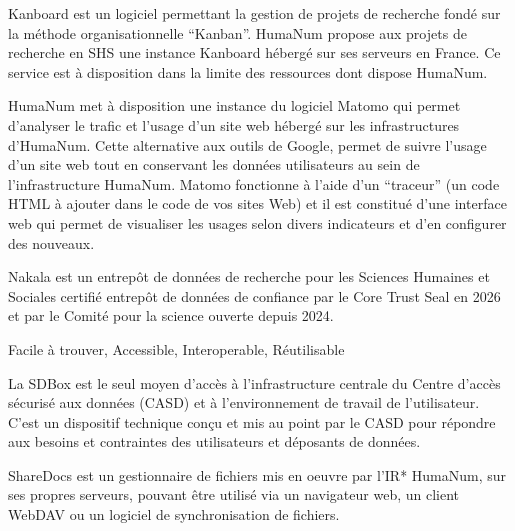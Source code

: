 \documentclass[letterpaper,10pt,english]{jupyterBook}
\begin{document}
\begin{description}
\sphinxAtStartPar
Kanboard est un logiciel permettant la gestion de projets de recherche fondé sur la méthode organisationnelle “Kanban”. Huma\sphinxhyphen{}Num propose aux projets de recherche en SHS une instance Kanboard hébergé sur ses serveurs en France. Ce service est à disposition dans la limite des ressources dont dispose Huma\sphinxhyphen{}Num.

\sphinxAtStartPar
Huma\sphinxhyphen{}Num met à disposition une instance du logiciel Matomo qui permet d’analyser le trafic et l’usage d’un site web hébergé sur les infrastructures d’Huma\sphinxhyphen{}Num. Cette alternative aux outils de Google, permet de suivre l’usage d’un site web tout en conservant les données utilisateurs au sein de l’infrastructure Huma\sphinxhyphen{}Num. Matomo fonctionne à l’aide d’un “traceur” (un code HTML à ajouter dans le code de vos sites Web) et il est constitué d’une interface web qui permet de visualiser les usages selon divers indicateurs et d’en configurer des nouveaux.

\sphinxAtStartPar
Nakala est un entrepôt de données de recherche pour les Sciences Humaines et Sociales certifié entrepôt de données de confiance par le Core Trust Seal en 2026 et par le Comité pour la science ouverte depuis 2024.

\sphinxAtStartPar
Facile à trouver, Accessible, Interoperable, Réutilisable

\sphinxAtStartPar
La SD\sphinxhyphen{}Box est le seul moyen d’accès à l’infrastructure centrale du Centre d’accès sécurisé aux données (CASD) et à l’environnement de travail de l’utilisateur. C’est un dispositif technique conçu et mis au point par le CASD pour répondre aux besoins et contraintes des utilisateurs et déposants de données.

\sphinxAtStartPar
ShareDocs est un gestionnaire de fichiers mis en oeuvre par l’IR* Huma\sphinxhyphen{}Num, sur ses propres serveurs, pouvant être utilisé via un navigateur web, un client WebDAV ou un logiciel de synchronisation de fichiers.


\end{description}
\end{document}
